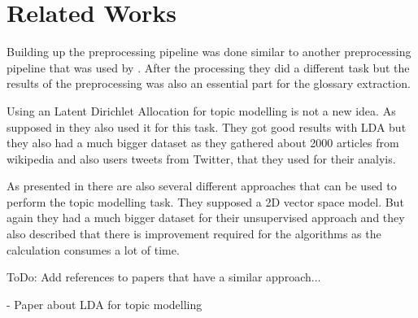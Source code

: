 \section{Related Works} %
\label{sec:related_works}

Building up the preprocessing pipeline was done similar to another preprocessing pipeline that was used by \cite{gemkow_automatic_2018}. After the processing they did a different task but the results of the preprocessing was also an essential part for the glossary extraction.

Using an Latent Dirichlet Allocation for topic modelling is not a new idea. As supposed in \cite{zhou_tong_text_2016} they also used it for this task. They got good results with LDA but they also had a much bigger dataset as they gathered about 2000 articles from wikipedia and also users tweets from Twitter, that they used for their analyis.

As presented in \cite{george_unsupervised_2018} there are also several different approaches that can be used to perform the topic modelling task. They supposed a 2D vector space model. But again they had a much bigger dataset for their unsupervised approach and they also described that there is improvement required for the algorithms as the calculation consumes a lot of time.


\colorbox{yellow!30}{ToDo:} Add references to papers that have a similar approach...

- Paper about LDA for topic modelling
